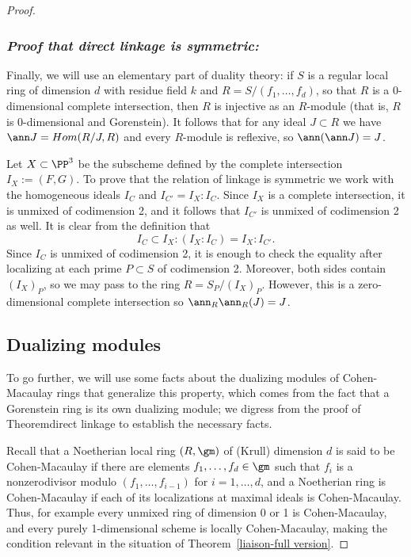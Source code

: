 \begin{proof}
 
\subsubsection{\it Proof that direct linkage is symmetric:}

Finally, we will use an elementary part of duality theory: if $S$ is a regular local ring of dimension $d$
with residue field $k$ and $R = S/(f_1,\dots, f_d)$, 
so that $R$ is a 0-dimensional complete intersection, then $R$ is injective as an $R$-module (that is, $R$ is 0-dimensional  and Gorenstein).
It follows that for any ideal $J\subset R$ we have $\ann J = Hom(R/J, R)$ and every $R$-module is reflexive,
so $\ann(\ann J) = J$.

Let $X\subset \PP^3$ be the subscheme defined by the complete intersection $I_X := (F,G)$.
To prove that the relation of linkage is symmetric we work with
the homogeneous ideals $I_C$ and $I_{C'} = I_X: I_C$. 
Since $I_X$ is a complete intersection, it is unmixed of codimension 2, and it
follows that $I_{C'}$ is unmixed of codimension 2 as well.
It is clear from the definition that
$$
I_C \subset I_X:(I_X:I_C) = I_X:I_{C'}.
$$
Since $I_C$ is unmixed of codimension 2, it is enough to check the equality
after localizing at each prime $P\subset S$ of codimension 2.
Moreover, both sides contain $(I_X)_P$, so we may pass to the ring $R = S_P/(I_X)_P$.
However, this is a zero-dimensional complete intersection so $\ann_R\ann_R(J) = J$.

\subsection{Dualizing modules}\label{duality}
To go further, we will use some facts about the dualizing modules of Cohen-Macaulay rings that generalize this
property, which comes from the fact that a Gorenstein ring is its own dualizing module; we digress from the 
proof of Theorem{direct linkage} to establish the necessary facts.

Recall that a Noetherian local ring $(R,\gm)$ of (Krull) dimension $d$ is said to be Cohen-Macaulay if there are elements $f_1,\dots,f_d\in \gm$ such that
$f_i$ is a nonzerodivisor modulo $(f_1,\dots,f_{i-1})$ for $i =1,\dots,d$, and a Noetherian ring is Cohen-Macaulay if each of its localizations at maximal ideals
is Cohen-Macaulay. Thus, for example every unmixed ring of dimension 0 or 1 is Cohen-Macaulay, and every purely 1-dimensional scheme is locally Cohen-Macaulay,
making the condition relevant in the situation of Theorem~\ref{liaison-full version}. 


\end{proof}
